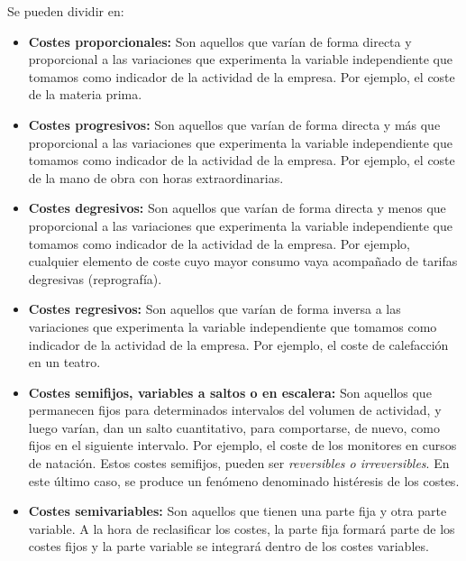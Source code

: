 \documentclass[12pt]{book} %
\begin{document}
\begin{definicion}
Se pueden dividir en:
\begin{itemize}
\item \textbf{Costes proporcionales:}  
  Son aquellos que varían de forma directa y proporcional a las variaciones que experimenta la variable independiente que tomamos como indicador de la actividad de la empresa. Por ejemplo, el coste de la materia prima.

\item \textbf{Costes progresivos: } 
  Son aquellos que varían de forma directa y más que proporcional a las variaciones que experimenta la variable independiente que tomamos como indicador de la actividad de la empresa. Por ejemplo, el coste de la mano de obra con horas extraordinarias.

\item \textbf{Costes degresivos: } 
  Son aquellos que varían de forma directa y menos que proporcional a las variaciones que experimenta la variable independiente que tomamos como indicador de la actividad de la empresa. Por ejemplo, cualquier elemento de coste cuyo mayor consumo vaya acompañado de tarifas degresivas (reprografía).

\item \textbf{Costes regresivos: } 
  Son aquellos que varían de forma inversa a las variaciones que experimenta la variable independiente que tomamos como indicador de la actividad de la empresa. Por ejemplo, el coste de calefacción en un teatro.

\item \textbf{Costes semifijos, variables a saltos o en escalera:}  
  Son aquellos que permanecen fijos para determinados intervalos del volumen de actividad, y luego varían, dan un salto cuantitativo, para comportarse, de nuevo, como fijos en el siguiente intervalo. Por ejemplo, el coste de los monitores en cursos de natación.  
  Estos costes semifijos, pueden ser \textit{reversibles o irreversibles}. En este último caso, se produce un fenómeno denominado histéresis de los costes.

\item \textbf{Costes semivariables: } 
  Son aquellos que tienen una parte fija y otra parte variable. A la hora de reclasificar los costes, la parte fija formará parte de los costes fijos y la parte variable se integrará dentro de los costes variables.


\end{itemize}
\end{definicion}
\end{document}

